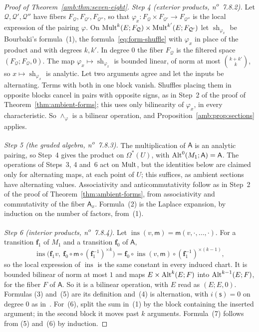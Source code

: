 \begin{proof}[Proof of Theorem~\ref{amb:thm:seven-eight}]
\emph{Step 4 (exterior products, n\textsuperscript{o}~7.8.2).} Let $\mathcal Q,\mathcal Q',\mathcal Q''$ have fibers $F_{\mathcal Q},F_{\mathcal Q'},F_{\mathcal Q''}$, so that $\varphi_x\colon F_{\mathcal Q}\times F_{\mathcal Q'}\to F_{\mathcal Q''}$ is the local expression of the pairing $\varphi$. On $\operatorname{Mult}^k(E;F_{\mathcal Q})\times\operatorname{Mult}^{k'}(E;F_{\mathcal Q'})$ let $\operatorname{sh}_{\varphi_x}$ be Bourbaki's formula~(1), the formula~\eqref{eq:form-shuffle} with $\varphi_x$ in place of the product and with degrees $k,k'$. In degree $0$ the fiber $F_{\mathcal Q}$ is the filtered space $(F_{\mathcal Q};F_{\mathcal Q},0)$. The map $\varphi_x\mapsto\operatorname{sh}_{\varphi_x}$ is bounded linear, of norm at most $\binom{k+k'}k$, so $x\mapsto\operatorname{sh}_{\varphi_x}$ is analytic. Let two arguments agree and let the inputs be alternating. Terms with both in one block vanish. Shuffles placing them in opposite blocks cancel in pairs with opposite signs, as in Step~2 of the proof of Theorem~\ref{thm:ambient-forms}; this uses only bilinearity of $\varphi_x$, in every characteristic. So $\wedge_\varphi$ is a bilinear operation, and Proposition~\ref{amb:prop:sections} applies.

\emph{Step 5 (the graded algebra, n\textsuperscript{o}~7.8.3).} The multiplication of $\mathsf A$ is an analytic pairing, so Step~4 gives the product on $\Omega^*(U)$, with $\operatorname{Alt}^0(M_1;\mathsf A)=\mathsf A$. The operations of Steps~3, 4 and~6 act on $\operatorname{Mult}$, but the identities below are claimed only for alternating maps, at each point of $U$; this suffices, as ambient sections have alternating values. Associativity and anticommutativity follow as in Step~2 of the proof of Theorem~\ref{thm:ambient-forms}, from associativity and commutativity of the fiber $\mathsf A_x$. Formula~(2) is the Laplace expansion, by induction on the number of factors, from~(1).

\emph{Step 6 (interior products, n\textsuperscript{o}~7.8.4).} Let $\operatorname{ins}(v,\mathsf m)=\mathsf m(v,\cdot,\dots,\cdot)$. For a transition $\mathbf f_1$ of $M_1$ and a transition $\mathbf f_0$ of $\mathsf A$,
\[
 \operatorname{ins}\bigl(\mathbf f_1v,\ \mathbf f_0\circ\mathsf m\circ(\mathbf f_1^{-1})^{\times k}\bigr)=\mathbf f_0\circ\operatorname{ins}(v,\mathsf m)\circ(\mathbf f_1^{-1})^{\times(k-1)},
\]
so the local expression of $\operatorname{ins}$ is the same constant in every induced chart. It is bounded bilinear of norm at most $1$ and maps $E\times\operatorname{Alt}^k(E;F)$ into $\operatorname{Alt}^{k-1}(E;F)$, for the fiber $F$ of $\mathsf A$. So it is a bilinear operation, with $E$ read as $(E;E,0)$. Formulas (3) and~(5) are its definition and~(4) is alternation, with $i(\mathsf s)=0$ on degree $0$ as in~\cite[n\textsuperscript{o}~7.8.4]{Bou}. For~(6), split the sum in~(1) by the block containing the inserted argument; in the second block it moves past $k$ arguments. Formula~(7) follows from (5) and~(6) by induction.


\end{proof}
